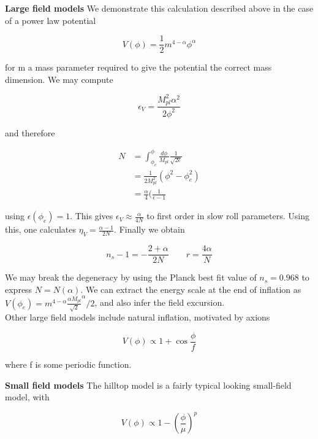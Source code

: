 \documentclass[a4paper,10pt]{article}
\newcommand{\Mp}{M_{pl}}
\newcommand{\half}{\frac{1}{2}}
\begin{document}
\textbf{Large field models} We demonstrate this calculation described above in the case of a power law potential

\begin{equation}
V(\phi) = \half m^{4-\alpha}\phi^\alpha
\end{equation}

for m a mass parameter required to give the potential the correct mass dimension. We may compute 

\begin{equation}
\epsilon_V = \frac{\Mp^2\alpha^2}{2\phi^2}
\end{equation}

and therefore

\begin{equation}
\begin{split}
N &= \int_{\phi_e}^\phi \frac{d\phi}{\Mp}\frac{1}{\sqrt{2\epsilon}} \\
&= \frac{1}{2\Mp^2}(\phi^2-\phi^2_e)\\
&= \frac{\alpha}{4}(\frac{1}{\epsilon-1}
\end{split}
\end{equation}

using $\epsilon(\phi_e)=1$. This gives $\epsilon_V \approx \frac{\alpha}{4N}$ to first order in slow roll parameters. Using this, one calculates $\eta_V=\frac{\alpha-1}{2N}$. Finally we obtain

\begin{equation}
n_s-1 = -\frac{2+\alpha}{2N} \qquad r=\frac{4\alpha}{N}
\end{equation}

We may break the degeneracy by using the Planck best fit value of $n_s=0.968$ to express $N=N(\alpha)$. We can extract the energy scale at the end of inflation as  $V(\phi_e)=m^{4-\alpha}\frac{\alpha\Mp}{\sqrt{2}}^\alpha/2$, and also infer the field excursion.\\

Other large field models include natural inflation, motivated by axions

\begin{equation}
V(\phi) \propto 1+\cos\frac{\phi}{f}
\end{equation}

where f is some periodic function.

\textbf{Small field models} The hilltop model is a fairly typical looking small-field model, with

\begin{equation}
V(\phi) \propto 1-(\frac{\phi}{\mu})^p 
\end{equation}
\end{document}
